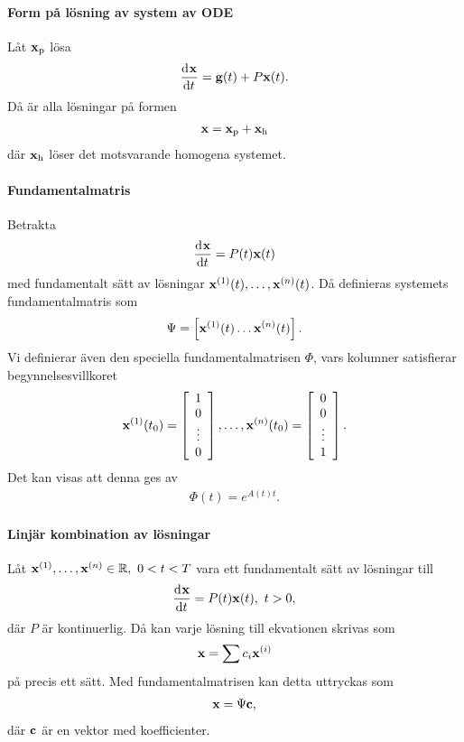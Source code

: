 \paragraph{Form på lösning av system av ODE}
Låt $\vb{x}_{\text{p}}$ lösa
\begin{align*}
	\dv[]{\vb{x}}{t} (t) = \vb{g}(t) + P\vb{x}(t).
\end{align*}
Då är alla lösningar på formen
\begin{align*}
	\vb{x} = \vb{x}_{\text{p}} + \vb{x}_{\text{h}}
\end{align*}
där $\vb{x}_{\text{h}}$ löser det motsvarande homogena systemet.

\paragraph{Fundamentalmatris}
Betrakta
\begin{align*}
	\dv[]{\vb{x}}{t} (t) = P(t)\vb{x}(t)
\end{align*}
med fundamentalt sätt av lösningar $\vb{x}^{(1)}(t), \dots, \vb{x}^{(n)}(t)$. Då definieras systemets fundamentalmatris som
\begin{align*}
	\Psi = \left[\vb{x}^{(1)}(t) \dots \vb{x}^{(n)}(t)\right].
\end{align*}
Vi definierar även den speciella fundamentalmatrisen $\Phi$, vars kolumner satisfierar begynnelsesvillkoret
\begin{align*}
	\vb{x}^{(1)}(t_{0}) =
	\left[\begin{array}{c}
		1      \\
		0      \\
		\vdots \\
		0
	\end{array}\right],
	\dots,
	\vb{x}^{(n)}(t_{0}) =
	\left[\begin{array}{c}
		0      \\
		0      \\
		\vdots \\
		1
	\end{array}\right].
\end{align*}
Det kan visas att denna ges av
\begin{align*}
	\Phi(t) = e^{A(t)t}.
\end{align*}

\paragraph{Linjär kombination av lösningar}
Låt $\vb{x}^{(1)}, \dots, \vb{x}^{(n)}\in\mathbb{R},\ 0 < t < T$ vara ett fundamentalt sätt av lösningar till
\begin{align*}
	\dv[]{\vb{x}}{t} (t) = P(t)\vb{x}(t),\ t > 0,
\end{align*}
där $P$ är kontinuerlig. Då kan varje lösning till ekvationen skrivas som
\begin{align*}
	\vb{x} = \sum c_{i}\vb{x}^{(i)}
\end{align*}
på precis ett sätt. Med fundamentalmatrisen kan detta uttryckas som
\begin{align*}
	\vb{x} = \Psi\vb{c},
\end{align*}
där $\vb{c}$ är en vektor med koefficienter.

